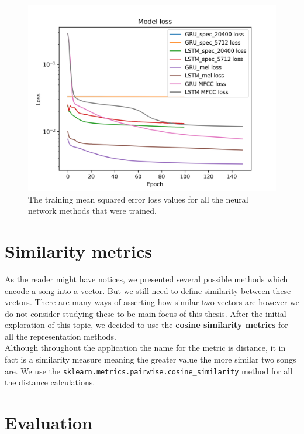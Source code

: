 \begin{figure}[h]
    \centering
	\includegraphics[width=120mm]{./img/all_training_graphs.png}
	\caption{The training mean squared error loss values for all the neural network methods that were trained.}
	\label{fig:all_model_training}
\end{figure}

\section{Similarity metrics}\label{sec:similarity_metrics}
As the reader might have notices, we presented several possible methods which encode a song into a vector. But we still need to define similarity between these vectors. There are many ways of asserting how similar two vectors are however we do not consider studying these to be main focus of this thesis. After the initial exploration of this topic, we decided to use the \textbf{cosine similarity metrics} for all the representation methods. \\
Although throughout the application the name for the metric is distance, it in fact is a similarity measure meaning the greater value the more similar two songs are. We use the \texttt{sklearn.metrics.pairwise.cosine\_similarity} method for all the distance calculations.

\section{Evaluation}\label{sec:evaluation}

